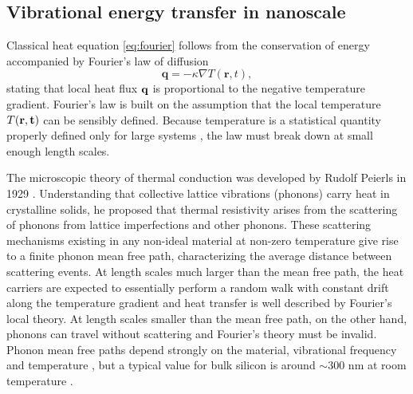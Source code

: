 
\subsection{Vibrational energy transfer in nanoscale}
\label{sec:intro_vib}
Classical heat equation \eqref{eq:fourier} follows from the conservation of energy accompanied by Fourier's law of diffusion \cite{fourier}
\begin{equation}
 \mathbf{q} = -\kappa \nabla T(\mathbf{r},t),
\end{equation}
stating that local heat flux $\mathbf{q}$ is proportional to the negative temperature gradient. Fourier's law is built on the assumption that the local temperature $T(\bf{r},t)$ can be sensibly defined. Because temperature is a statistical quantity properly defined only for large systems \cite{}, the law must break down at small enough length scales. 

The microscopic theory of thermal conduction was developed by Rudolf Peierls in 1929 \cite{peierls29}. Understanding that collective lattice vibrations (phonons) carry heat in crystalline solids, he proposed that thermal resistivity arises from the scattering of phonons from lattice imperfections and other phonons. These scattering mechanisms existing in any non-ideal material at non-zero temperature give rise to a finite phonon mean free path, characterizing the average distance between scattering events. At length scales much larger than the mean free path, the heat carriers are expected to essentially perform a random walk with constant drift along the temperature gradient and heat transfer is well described by Fourier's local theory. At length scales smaller than the mean free path, on the other hand, phonons can travel without scattering and Fourier's theory must be invalid. Phonon mean free paths depend strongly on the material, vibrational frequency and temperature \cite{}, but a typical value for bulk silicon is around $\sim 300$ nm at room temperature \cite{ju99}. 


